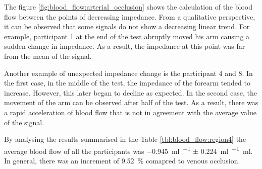 The figure \ref{fig:blood_flow:arterial_occlusion} shows the calculation of the blood flow between the points of decreasing impedance. From a qualitative perspective, it can be observed that some signals do not show a decreasing linear trend. For example, participant 1 at the end of the test abruptly moved his arm causing a sudden change in impedance. As a result, the impedance at this point was far from the mean of the signal.

Another example of unexpected impedance change is the participant 4 and 8. In the first case, in the middle of the test, the impedance of the forearm tended to increase. However, this later began to decline as expected. In the second case, the movement of the arm can be observed after half of the test. As a result, there was a rapid acceleration of blood flow that is not in agreement with the average value of the signal.

By analysing the results summarised in the Table \ref{tbl:blood_flow:region4} the average blood flow of all the participants was \SI{-0.945}{\ml\per\min} $\pm$ \SI{0.224}{\ml\per{}\ml}. In general, there was an increment of \SI{9.52}{\percent} comapred to venous occlusion. 


